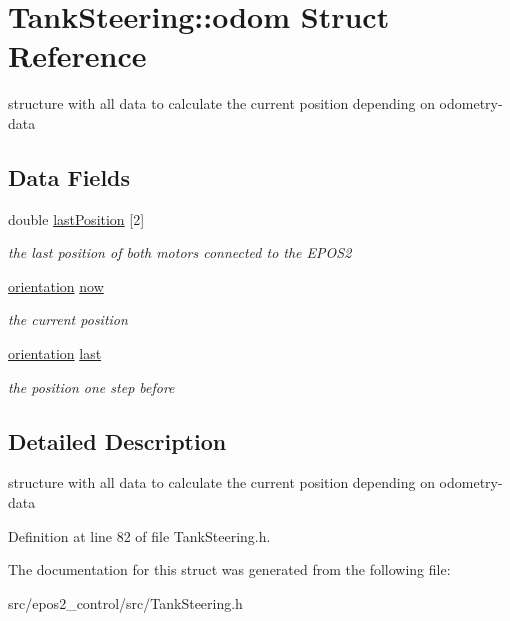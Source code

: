 \hypertarget{structTankSteering_1_1odom}{\section{Tank\-Steering\-:\-:odom Struct Reference}
\label{structTankSteering_1_1odom}
}


structure with all data to calculate the current position depending on odometry-\/data  


\subsection*{Data Fields}
\begin{DoxyCompactItemize}
\item 
\hypertarget{structTankSteering_1_1odom_a25a805ceeca36f85c91baaec605616d5}{double \hyperlink{structTankSteering_1_1odom_a25a805ceeca36f85c91baaec605616d5}{last\-Position} \mbox{[}2\mbox{]}}\label{structTankSteering_1_1odom_a25a805ceeca36f85c91baaec605616d5}

\begin{DoxyCompactList}\small\item\em the last position of both motors connected to the E\-P\-O\-S2 \end{DoxyCompactList}\item 
\hypertarget{structTankSteering_1_1odom_a20be7326384f778c008d55a0d304f0ab}{\hyperlink{structTankSteering_1_1orientation}{orientation} \hyperlink{structTankSteering_1_1odom_a20be7326384f778c008d55a0d304f0ab}{now}}\label{structTankSteering_1_1odom_a20be7326384f778c008d55a0d304f0ab}

\begin{DoxyCompactList}\small\item\em the current position \end{DoxyCompactList}\item 
\hypertarget{structTankSteering_1_1odom_ae6353ef712a0b7bc9c783d77229d2221}{\hyperlink{structTankSteering_1_1orientation}{orientation} \hyperlink{structTankSteering_1_1odom_ae6353ef712a0b7bc9c783d77229d2221}{last}}\label{structTankSteering_1_1odom_ae6353ef712a0b7bc9c783d77229d2221}

\begin{DoxyCompactList}\small\item\em the position one step before \end{DoxyCompactList}\end{DoxyCompactItemize}


\subsection{Detailed Description}
structure with all data to calculate the current position depending on odometry-\/data 

Definition at line 82 of file Tank\-Steering.\-h.



The documentation for this struct was generated from the following file\-:\begin{DoxyCompactItemize}
\item 
src/epos2\-\_\-control/src/Tank\-Steering.\-h\end{DoxyCompactItemize}
